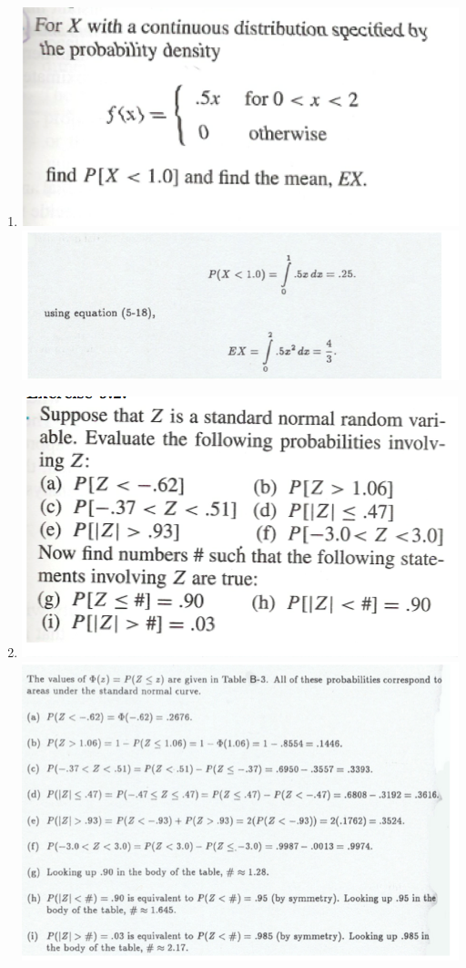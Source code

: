 \documentclass{article}\usepackage{graphicx, color}
\numberwithin{equation}{section}
\begin{document}
\begin{flushleft}
\begin{enumerate}[1. ]
\item 
{} \includegraphics{../../fig/h6p2p5.png}
 \includegraphics{../../fig/h6p2p5sol.png}


\item 
{} \includegraphics{../../fig/h6p3.png}
 \includegraphics{../../fig/h6p3sol.png}



\end{enumerate}
\end{flushleft}
\end{document}

